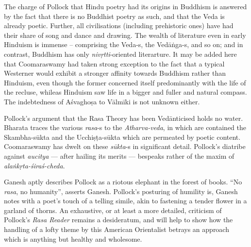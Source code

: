 The charge of Pollock that Hindu poetry had its origins in Buddhism is answered by the fact that there is no Buddhist poetry as such, and that the Veda is already poetic. Further, all civilisations (including prehistoric ones) have had their share of song and dance and drawing. The wealth of literature even in early Hinduism is immense -- comprising the Veda-s, the Vedāṅga-s, and so on; and in contrast, Buddhism has only \textsl{nivṛtti}-oriented literarture. It may be added here that Coomaraswamy had taken strong exception to the fact that a typical Westerner would exhibit a stronger affinity towards Buddhism rather than Hinduism, even though the former concerned itself predominantly with the life of the recluse, whileas Hinduism saw life in a bigger and fuller and natural compass. The indebtedness of Aśvaghoṣa to Vālmīki is not unknown either.

Pollock’s argument that the Rasa Theory has been Vedānticised holds no water. Bharata traces the various \textsl{rasa}-s to the \textsl{Atharva-veda}, in which are contained the Skambha-sūkta and the Ucchiṣṭa-sūkta which are permeated by poetic content. Coomaraswamy has dwelt on these \textsl{sūkta}-s in significant detail. Pollock’s diatribe against \textsl{aucitya} --- after hailing its merits --- bespeaks rather of the maxim of \textsl{alaṅkṛta-śiraś-cheda}.
\newpage

Ganesh aptly describes Pollock as a riotous elephant in the forest of books. “No \textsl{rasa}, no humanity”, asserts Ganesh. Pollock's posturing of humility is, Ganesh notes with a poet's touch of a telling simile, akin to fastening a tender flower in a garland of thorns. An exhaustive, or at least a more detailed, criticism of Pollock’s \textsl{Rasa Reader} remains a desideratum, and will help to show how the handling of a lofty theme by this American Orientalist betrays an approach which is anything but healthy and wholesome.

